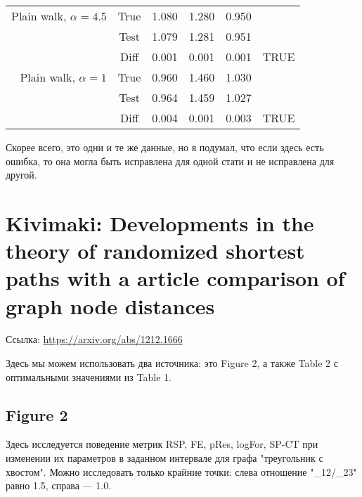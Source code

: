 \documentclass{article}
\begin{document}
\begin{table}[H]
\begin{center}
\begin{tabular}{rc|ccc|c}
                     \hline
Plain walk, $\alpha=4.5$ & True & 1.080                   & 1.280                                     & 0.950                   &        \\
                     & Test & 1.079                   & 1.281                                     & 0.951                   &        \\
                     & Diff & 0.001                   & 0.001                                     & 0.001                   & TRUE   \\
                     \hline
Plain walk, $\alpha=1$ & True & 0.960                   & 1.460                                     & 1.030                   &        \\
                     & Test & 0.964                   & 1.459                                     & 1.027                   &        \\
                     & Diff & 0.004                   & 0.001                                     & 0.003                   & TRUE  
    \end{tabular}
  \end{center}
  \label{che2:table1cheated}
\end{table}

Скорее всего, это одни и те же данные, но я подумал, что если здесь есть ошибка, то она могла быть исправлена для одной стати и не исправлена для другой.


\section{Kivimaki: Developments in the theory of randomized shortest paths with a article comparison of graph node distances}
Ссылка: \url{https://arxiv.org/abs/1212.1666}

Здесь мы можем использовать два источника: это Figure 2, а также Table 2 с оптимальными значениями из Table 1.

\subsection{Figure 2}
Здесь исследуется поведение метрик RSP, FE, pRes, logFor, SP-CT при изменении их параметров в заданном интервале для графа "треугольник с хвостом". Можно исследовать только крайние точки: слева отношение "\delta_{12}/\delta_{23}" равно 1.5, справа --- 1.0.
\end{document}
